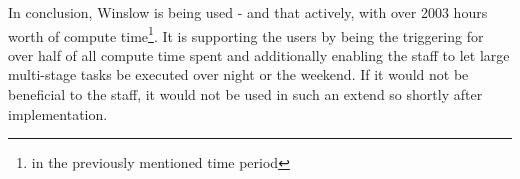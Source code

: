 In conclusion, Winslow is being used - and that actively, with over 2003 hours worth of compute time\footnote{in the previously mentioned time period}.
It is supporting the users by being the triggering for over half of all compute time spent and additionally enabling the staff to let large multi-stage tasks be executed over night or the weekend.
If it would not be beneficial to the staff, it would not be used in such an extend so shortly after implementation.

\begin{comment}
\todo{remove figure below?}
\begin{figure}[H]
	\centering
	\begin{tikzpicture}
		\begin{axis}[
			ybar interval,
  			xtick=,%
			width=1.0\textwidth,
			height=0.6\textwidth,
			xmin=0
			]
			\addplot+[hist={data=x}] file {duration.csv};
		\end{axis}
	\end{tikzpicture}
	\centering
	\begin{tikzpicture}
		\begin{axis}[
			width=1.0\textwidth,
			height=0.2\textwidth,
			boxplot/draw direction=x,
			xmin=0,xmax=280
		]
		\addplot+[boxplot={average=auto,data=x}] file {duration.csv};
		\end{axis}
	\end{tikzpicture}
	\caption{Stages automatically starting at a given day of the week and time of day}
\end{figure}
\end{comment}



